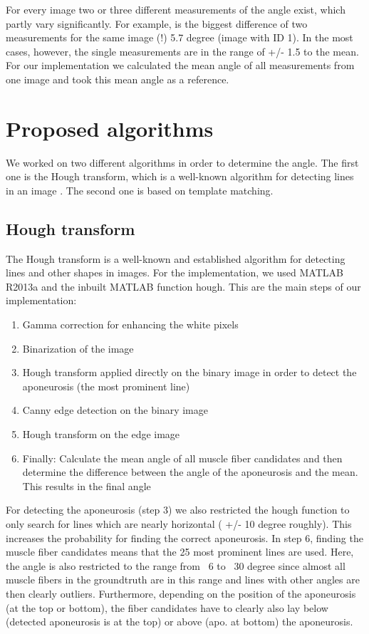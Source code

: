 \documentclass[10pt,twocolumn,letterpaper]{article}
\begin{document}
For every image two or three different measurements of the angle exist, which partly vary significantly. For example, is the biggest difference of two measurements for the same image (!) 5.7 degree (image with ID 1). In the most cases, however, the single measurements are in the range of +/- 1.5 to the mean.
For our implementation we calculated the mean angle of all measurements from one image and took this mean angle as a reference.

\section{Proposed algorithms}
We worked on two different algorithms in order to determine the angle. The first one is the Hough transform, which is a well-known algorithm for detecting lines in an image \cite{c1962method}. The second one is based on template matching.

\subsection{Hough transform}
\label{sec:hough}
The Hough transform is a well-known and established algorithm for detecting lines and other shapes in images. For the implementation, we used MATLAB R2013a and the inbuilt MATLAB function hough.
This are the main steps of our implementation:

\begin{enumerate}
     \item Gamma correction for enhancing the white pixels
     \item Binarization of the image
     \item Hough transform applied directly on the binary image in order to detect the aponeurosis (the most prominent line)
     \item Canny edge detection on the binary image
     \item Hough transform on the edge image
     \item Finally: Calculate the mean angle of all muscle fiber candidates and then determine the difference between the angle of the aponeurosis and the mean. This results in the final angle
\end{enumerate}

For detecting the aponeurosis (step 3) we also restricted the hough function to only search for lines which are nearly horizontal ( +/- 10 degree roughly). This increases the probability for finding the correct aponeurosis. In step 6, finding the muscle fiber candidates means that the 25 most prominent lines are used. Here, the angle is also restricted to the range from ~6 to ~30 degree since almost all muscle fibers in the groundtruth are in this range and lines with other angles are then clearly outliers. Furthermore, depending on the position of the aponeurosis (at the top or bottom), the fiber candidates have to clearly also lay below (detected aponeurosis is at the top) or above (apo. at bottom) the aponeurosis.
\end{document}
